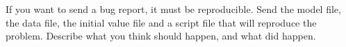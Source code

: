 \documentclass[11pt, a4paper, titlepage]{report}
\newcommand{\biips}{\textsf{Biips}}
\newcommand{\BUGS}{\textsf{BUGS}}
\begin{document}
If you want to send a bug report, it must be reproducible. Send the
model file, the data file, the initial value file and a script file
that will reproduce the problem. Describe what you think should
happen, and what did happen.

% 
\end{document}
